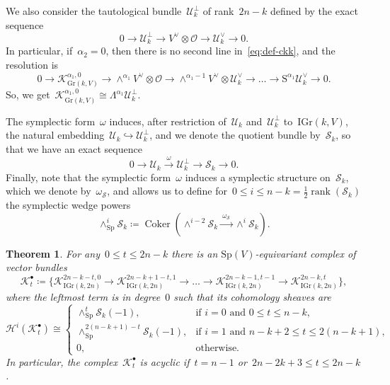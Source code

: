 \documentclass[a4paper]{article}
\newcommand{\Sp}{\mathrm{Sp}}
\newcommand{\Gr}{\mathrm{Gr}}
\newcommand{\IGr}{\mathrm{IGr}}
\newcommand{\cH}{\mathcal{H}}
\newcommand{\cK}{\mathcal{K}}
\newcommand{\cU}{\mathcal{U}}
\newcommand{\cS}{\mathcal{S}}
\newcommand{\cO}{\mathcal{O}}
\newtheorem{theorem}{Theorem}[section]
\theoremstyle{remark}
\theoremstyle{definition}
\begin{document}
We also consider the tautological bundle~\(\cU_k^\perp\) of rank~\(2n - k\) defined by the exact sequence
\begin{equation}
\label{eq:def-uperp}
0 \to \cU_k^\perp \to V^\vee \otimes \cO \to \cU_k^\vee \to 0.
\end{equation}
In particular, if~\(\alpha_2 = 0\), then there is no second line in~\eqref{eq:def-ckk}, and the resolution is
\begin{equation*}
	0 \to \cK_{\Gr(k,V)}^{\alpha_1, 0} \to 
	\wedge^{\alpha_1} V^\vee \otimes \cO \to 
	\wedge^{\alpha_1-1} V^\vee \otimes \cU_k^\vee \to 
	\dots \to
	\mathrm {S}^{\alpha_1}\cU_k^\vee \to 0.
\end{equation*}
So, we get~\(\cK_{\Gr(k,V)}^{\alpha_1, 0} \cong \Lambda^{\alpha_1} \cU_k^{\perp}\).

The symplectic form~\(\omega\) induces, after restriction of~\(\cU_k\) and~\(\cU_k^\perp\) to~\(\IGr(k,V)\), 
the natural embedding~\(\cU_k \hookrightarrow \cU_k^\perp\),
and we denote the quotient bundle by~\(\cS_k\), so that we have an exact sequence
\begin{equation}
\label{eq:def-csk}
0 \to \cU_k \xrightarrow{\ \omega\ } \cU_k^\perp \xrightarrow{\quad} \cS_k \to 0.
\end{equation}
Finally, note that the symplectic form~\(\omega\) induces a symplectic structure on~\(\cS_k\), which we denote by~\(\omega_\cS\),
and allows us to define for~\(0 \le i \le n - k = \tfrac12\operatorname{rank}(\cS_k)\) the symplectic wedge powers 
\begin{equation}
\label{eq:def-wedge-sp}
\wedge^i_\Sp\cS_k \coloneqq \operatorname{Coker}(\wedge^{i-2}\cS_k \xrightarrow{\ \omega_\cS\ } \wedge^i\cS_k).
\end{equation}





\begin{theorem}
\label{thm:main}
For any~\(0 \le t \le 2n - k\) there is an \(\Sp(V)\)-equivariant complex of vector bundles
\begin{equation}
\label{eq:ckk-special}
\cK_{t}^\bullet \coloneqq
\Big\{
\cK_{\IGr(k,2n)}^{2n-k-t,0} \to 
\cK_{\IGr(k,2n)}^{2n-k+1-t,1} \to 
\dots \to
\cK_{\IGr(k,2n)}^{2n-k-1,t-1} \to 
\cK_{\IGr(k,2n)}^{2n-k,t} 
\Big\},
\end{equation}
where the leftmost term is in degree~\(0\) such that its cohomology sheaves are
\begin{equation}
\label{eq:ch-cckk}
\cH^i(\cK_t^\bullet) \cong
\begin{cases}
\wedge_\Sp^{t}\cS_k(-1), & \text{if~\(i = 0\) and~\(0 \le t \le n-k\)},\\
\wedge_\Sp^{2(n-k+1) - t}\cS_k(-1), & \text{if~\(i = 1\) and~\(n-k+2 \le t \le 2(n-k+1)\)},\\
0, & \text{otherwise}.
\end{cases}
\end{equation}
In particular, the complex~\(\cK_{t}^\bullet\) is acyclic if~\(t = n - 1\) or~\(2n - 2k + 3 \le t \le 2n - k\). 
\end{theorem}
\end{document}
